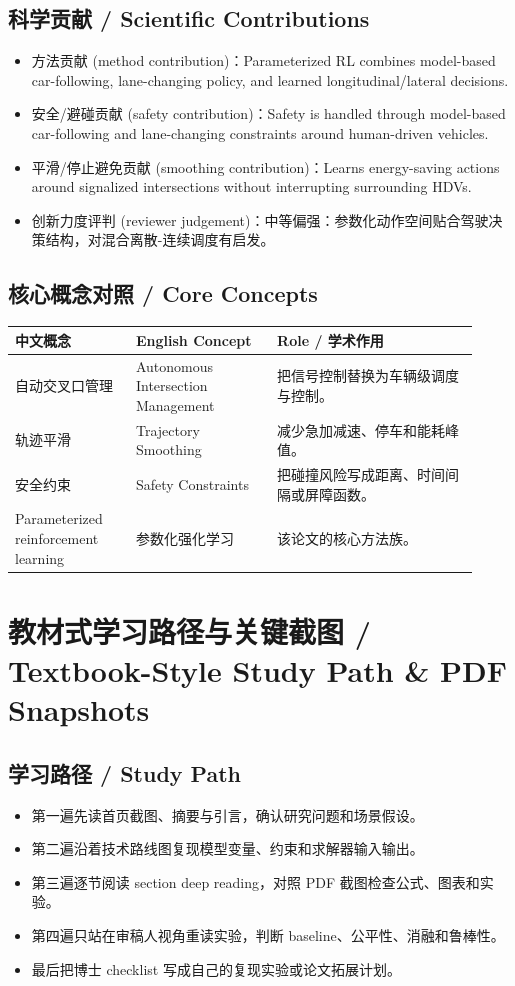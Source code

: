\documentclass[UTF8,a4paper,11pt,fontset=fandol]{ctexart}
\begin{document}
\subsection{科学贡献 / Scientific Contributions}
\begin{itemize}
\item 方法贡献 (method contribution)：Parameterized RL combines model-based car-following, lane-changing policy, and learned longitudinal/lateral decisions.
\item 安全/避碰贡献 (safety contribution)：Safety is handled through model-based car-following and lane-changing constraints around human-driven vehicles.
\item 平滑/停止避免贡献 (smoothing contribution)：Learns energy-saving actions around signalized intersections without interrupting surrounding HDVs.
\item 创新力度评判 (reviewer judgement)：中等偏强：参数化动作空间贴合驾驶决策结构，对混合离散-连续调度有启发。
\end{itemize}


\subsection{核心概念对照 / Core Concepts}
\begin{longtable}{p{0.24\linewidth}p{0.28\linewidth}p{0.40\linewidth}}
\toprule
中文概念 & English Concept & Role / 学术作用\\
\midrule
自动交叉口管理 & Autonomous Intersection Management & 把信号控制替换为车辆级调度与控制。 \\
轨迹平滑 & Trajectory Smoothing & 减少急加减速、停车和能耗峰值。 \\
安全约束 & Safety Constraints & 把碰撞风险写成距离、时间间隔或屏障函数。 \\
Parameterized reinforcement learning & 参数化强化学习 & 该论文的核心方法族。 \\
\bottomrule
\end{longtable}

\section{教材式学习路径与关键截图 / Textbook-Style Study Path \& PDF Snapshots}
\subsection{学习路径 / Study Path}
\begin{itemize}
\item 第一遍先读首页截图、摘要与引言，确认研究问题和场景假设。
\item 第二遍沿着技术路线图复现模型变量、约束和求解器输入输出。
\item 第三遍逐节阅读 section deep reading，对照 PDF 截图检查公式、图表和实验。
\item 第四遍只站在审稿人视角重读实验，判断 baseline、公平性、消融和鲁棒性。
\item 最后把博士 checklist 写成自己的复现实验或论文拓展计划。
\end{itemize}
\end{document}
